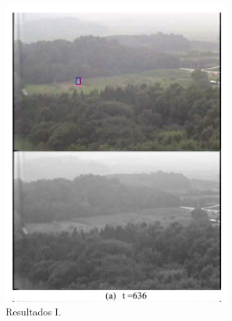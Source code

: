 \documentclass{beamer}
\begin{document}
\begin{frame}{}
	\begin{columns}
		\begin{column}{0.50\textwidth}
			\begin{figure}[H]
				\centering
				\begin{center}
				\includegraphics[width=0.75\textwidth]{img/fig2-artigo3-i.png}
				\caption{Resultados I.}
				\label{fig:sar}
				\end{center}
			\end{figure}
		\end{column}
	

\end{columns}
\end{frame}
\end{document}
